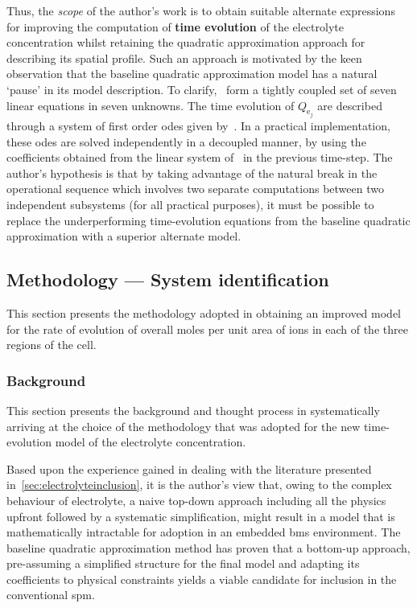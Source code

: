 Thus,   the  \emph{scope}   of  the   author's  work   is  to   obtain  suitable
alternate   expressions   for   improving  the   computation   of   \textbf{time
evolution}  of  the electrolyte  concentration  whilst  retaining the  quadratic
approximation   approach   for  describing   its   spatial   profile.  Such   an
approach  is motivated  by  the  keen observation  that  the baseline  quadratic
approximation  model  has  a  natural  `pause'  in  its  model  description.  To
clarify,~  form a  tightly
coupled set of  seven linear equations in seven unknowns.  The time evolution of
$Q_{\text{e}_j}$  are described  through  a system  of  first order  \glspl{ode}
given by~.  In a
practical  implementation,  these  \glspl{ode}  are solved  independently  in  a
decoupled  manner,\ie{}  by using  the  coefficients  obtained from  the  linear
system of~ in the previous
time-step. The  author's hypothesis is that  by taking advantage of  the natural
break  in the  operational  sequence which  involves  two separate  computations
between  two independent  subsystems (for  all practical  purposes), it  must be
possible  to  replace  the  underperforming time-evolution  equations  from  the
baseline quadratic approximation with a superior alternate model.

\subsection{Methodology --- System identification}

This section presents the methodology adopted in obtaining an improved model for
the rate of evolution  of overall moles per unit area of   ions in each
of the three regions of the cell.

\subsubsection*{Background}

This  section presents  the  background and  thought  process in  systematically
arriving  at  the  choice of  the  methodology  that  was  adopted for  the  new
time-evolution model of the electrolyte concentration.

Based  upon the  experience  gained  in dealing  with  the literature  presented
in~\cref{sec:electrolyteinclusion}, it is  the author's view that,  owing to the
complex behaviour of electrolyte, a  naive top-down approach \ie{} including all
the physics upfront  followed by a systematic simplification, might  result in a
model that is  mathematically intractable for adoption in  an embedded \gls{bms}
environment.  The baseline  quadratic  approximation method  has  proven that  a
bottom-up  approach, \ie{}  pre-assuming a  simplified structure  for the  final
model  and adapting  its coefficients  to physical  constraints yields  a viable
candidate for inclusion in the conventional \gls{spm}.

